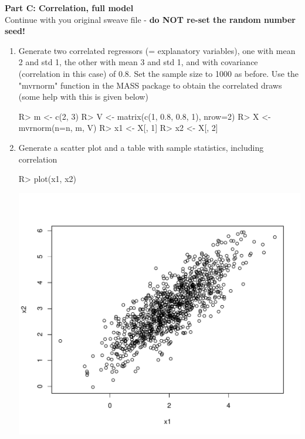 \documentclass[11pt,reqno]{article}   %
\begin{document}
\textbf{Part C: Correlation, full model}\\
Continue with you original sweave file - \textbf{do NOT re-set the random number seed!}\\

\begin{enumerate}
\item
Generate two correlated regressors (= explanatory variables), one with mean 2 and std 1, 
the other with mean 3 and std 1, and with covariance (correlation in this case) of 0.8.  
Set the sample size to 1000 as before.  
Use the "mvrnorm" function in the MASS package to obtain the correlated draws (some help with this is given below)

\begin{Schunk}
\begin{Sinput}
R> m <- c(2, 3)
R> V <- matrix(c(1, 0.8, 0.8, 1), nrow=2)
R> X <- mvrnorm(n=n, m, V)
R> x1 <- X[, 1]
R> x2 <- X[, 2]
\end{Sinput}
\end{Schunk}

\item
Generate a scatter plot and a table with sample statistics, including correlation

\begin{Schunk}
\begin{Sinput}
R> plot(x1, x2)
\end{Sinput}
\end{Schunk}
\includegraphics{ps1-chunk3-2}


\end{enumerate}
\end{document}
